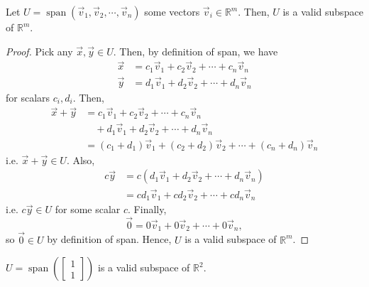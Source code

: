 \documentclass[]{book}
\DeclareMathOperator{\vecspan}{span}
\newcommand{\vecn}[1]{\ensuremath{\vec{v}_{#1}}}
\begin{document}
\begin{theorem}
    \label{thm:span_subspace}
    Let $U=\vecspan(\vec{v}_1, \vec{v}_2, \cdots, \vec{v}_n)$ some vectors $\vecn{i} \in \mathbb{R}^m$. Then, $U$ is a valid subspace of $\mathbb{R}^m$.
\begin{proof}
    Pick any $\vec{x}, \vec{y} \in U$. Then, by definition of span, we have
    \begin{align*}
        \vec{x} &= c_1\vecn{1} + c_2\vecn{2} + \cdots + c_n\vecn{n} \\
        \vec{y} &= d_1\vecn{1} + d_2\vecn{2} + \cdots + d_n\vecn{n}
    \end{align*}
    for scalars $c_i,d_i$. Then,
    \begin{equation*}
        \begin{split}
            \vec{x} + \vec{y} &= c_1\vecn{1} + c_2\vecn{2} + \cdots + c_n\vecn{n} \\
            & \quad + d_1\vecn{1} + d_2\vecn{2} + \cdots + d_n\vecn{n} \\
            &= (c_1+d_1)\vecn{1} + (c_2+d_2)\vecn{2} + \cdots + (c_n + d_n)\vecn{n}
        \end{split}
    \end{equation*}
    i.e. $\vec{x} + \vec{y} \in U$. Also, 
    \begin{equation*}
        \begin{split}
            c\vec{y} &= c(d_1\vecn{1} + d_2\vecn{2} + \cdots + d_n\vecn{n}) \\
            &= cd_1\vecn{1} + cd_2\vecn{2} + \cdots + cd_n\vecn{n}
        \end{split}
    \end{equation*}
    i.e. $c\vec{y} \in U$ for some scalar $c$. Finally,
    \begin{equation*}
        \vec{0} = 0\vecn{1} + 0\vecn{2} + \cdots + 0\vecn{n},
    \end{equation*}
    so $\vec{0} \in U$ by definition of span. Hence, $U$ is a valid subspace of $\mathbb{R}^m$. 
\end{proof}
\end{theorem}

\begin{example}
    $U=\vecspan\left(\begin{bmatrix}1 \\ 1\end{bmatrix}\right)$ is a valid subspace of $\mathbb{R}^2$. \hfill \qedsymbol
\end{example}
\end{document}
